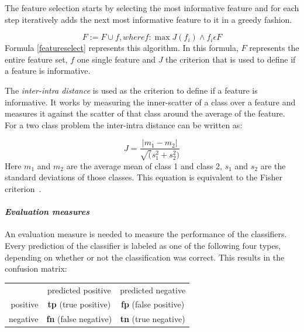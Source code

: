 The feature selection starts by selecting the most informative feature and for each step iteratively adds the next most informative feature to it in a greedy fashion.

\begin{equation}
\label{featureselect}
F := F \cup f, where f: \max{J(f_i)} \wedge f_i \epsilon F
\end{equation}
Formula \ref{featureselect} represents this algorithm.
In this formula, $F$ represents the entire feature set, $f$ one single feature and $J$ the criterion that is used to define if a feature is informative.

The \textit{inter-intra distance} is used as the criterion to define if a feature is informative.
It works by measuring the inner-scatter of a class over a feature and measures it against the scatter of that class around the average of the feature.
For a two class problem the inter-intra distance can be written as:

\begin{equation}
\label{interintra}
J = \frac{|m_1-m_2|}{\sqrt(s^2_1 + s^2_2)}
\end{equation}
Here $m_1$ and $m_2$ are the average mean of class 1 and class 2, $s_1$ and $s_2$ are the standard deviations of those classes.
This equation is  equivalent to the Fisher criterion~\cite{malina1981extended}.\\

\paragraph{\textit{Evaluation measures}}
An evaluation measure is needed to measure the performance of the classifiers.
Every prediction of the classifier is labeled as one of the following four types,
depending on whether or not the classification was correct. This results in the confusion matrix:\\

\begin{tabular}{r|c|c|}
\multicolumn{1}{r}{}
 &  \multicolumn{1}{c}{predicted positive}
 & \multicolumn{1}{c}{predicted negative} \\
\cline{2-3}
positive & \textbf{tp} (true positive) & \textbf{fp} (false positive) \\
\cline{2-3}
negative & \textbf{fn} (false negative) & \textbf{tn} (true negative) \\
\cline{2-3}
\end{tabular}\\\\


